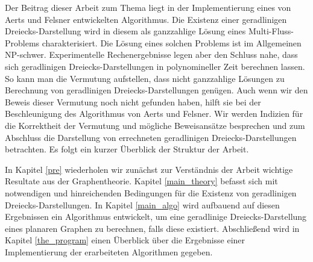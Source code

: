Der Beitrag dieser Arbeit zum Thema liegt in der Implementierung eines von Aerts und Felsner entwickelten Algorithmus. Die Existenz einer geradlinigen Dreiecks-Darstellung wird in diesem als ganzzahlige Lösung eines Multi-Fluss-Problems charakterisiert. Die Lösung eines solchen Problems ist im Allgemeinen NP-schwer. Experimentelle Rechenergebnisse legen aber den Schluss nahe, dass sich geradlinigen Dreiecks-Darstellungen in polynomineller Zeit berechnen lassen. So kann man die Vermutung aufstellen, dass nicht ganzzahlige Lösungen zu Berechnung von geradlinigen Dreiecks-Darstellungen genügen. Auch wenn wir den Beweis dieser Vermutung noch nicht gefunden haben, hilft sie bei der Beschleunigung des Algorithmus von Aerts und Felsner. Wir werden Indizien für die Korrektheit der Vermutung und mögliche Beweisansätze besprechen und zum Abschluss die Darstellung von errechneten geradlinigen Dreiecks-Darstellungen betrachten. Es folgt ein kurzer Überblick der Struktur der Arbeit.

In Kapitel \ref{pre} wiederholen wir zunächst zur Verständnis der Arbeit wichtige Resultate aus der Graphentheorie. Kapitel \ref{main_theory} befasst sich mit notwendigen und hinreichenden Bedingungen für die Existenz von geradlinigen Dreiecks-Darstellungen. In Kapitel \ref{main_algo} wird aufbauend auf diesen Ergebnissen ein Algorithmus entwickelt, um eine geradlinige Dreiecks-Darstellung eines planaren Graphen zu berechnen, falls diese existiert. Abschließend wird in Kapitel \ref{the_program} einen Überblick über die Ergebnisse einer Implementierung der erarbeiteten Algorithmen gegeben.